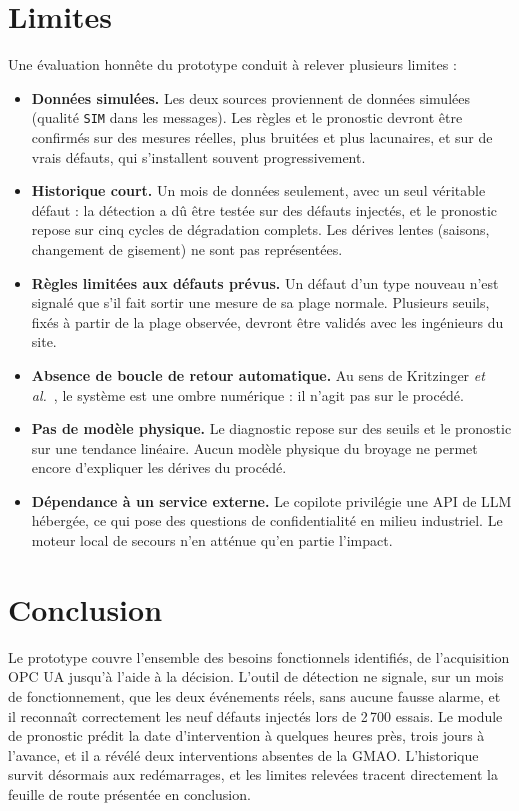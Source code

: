 \section{Limites}
\label{sec:limites}
Une évaluation honnête du prototype conduit à relever plusieurs limites :
\begin{itemize}
  \item \textbf{Données simulées.} Les deux sources proviennent de données simulées (qualité \texttt{SIM} dans les messages). Les règles et le pronostic devront être confirmés sur des mesures réelles, plus bruitées et plus lacunaires, et sur de vrais défauts, qui s'installent souvent progressivement.
  \item \textbf{Historique court.} Un mois de données seulement, avec un seul véritable défaut : la détection a dû être testée sur des défauts injectés, et le pronostic repose sur cinq cycles de dégradation complets. Les dérives lentes (saisons, changement de gisement) ne sont pas représentées.
  \item \textbf{Règles limitées aux défauts prévus.} Un défaut d'un type nouveau n'est signalé que s'il fait sortir une mesure de sa plage normale. Plusieurs seuils, fixés à partir de la plage observée, devront être validés avec les ingénieurs du site.
  \item \textbf{Absence de boucle de retour automatique.} Au sens de Kritzinger \textit{et al.}~\cite{kritzinger2018}, le système est une ombre numérique : il n'agit pas sur le procédé.
  \item \textbf{Pas de modèle physique.} Le diagnostic repose sur des seuils et le pronostic sur une tendance linéaire. Aucun modèle physique du broyage ne permet encore d'expliquer les dérives du procédé.
  \item \textbf{Dépendance à un service externe.} Le copilote privilégie une API de LLM hébergée, ce qui pose des questions de confidentialité en milieu industriel. Le moteur local de secours n'en atténue qu'en partie l'impact.
\end{itemize}

\section{Conclusion}
Le prototype couvre l'ensemble des besoins fonctionnels identifiés, de l'acquisition OPC UA jusqu'à l'aide à la décision. L'outil de détection ne signale, sur un mois de fonctionnement, que les deux événements réels, sans aucune fausse alarme, et il reconnaît correctement les neuf défauts injectés lors de 2\,700 essais. Le module de pronostic prédit la date d'intervention à quelques heures près, trois jours à l'avance, et il a révélé deux interventions absentes de la GMAO. L'historique survit désormais aux redémarrages, et les limites relevées tracent directement la feuille de route présentée en conclusion.
